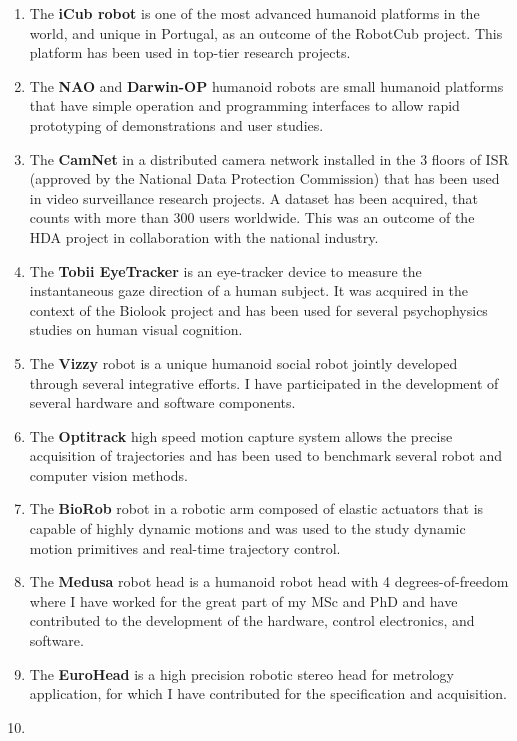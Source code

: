 \documentclass[
]{article}
\begin{document}
\begin{enumerate}
\def\labelenumi{\arabic{enumi}.}
\item
  The \textbf{iCub robot} is one of the most advanced humanoid platforms
  in the world, and unique in Portugal, as an outcome of the RobotCub
  project. This platform has been used in top-tier research projects.
\item
  The \textbf{NAO} and \textbf{Darwin-OP} humanoid robots are small
  humanoid platforms that have simple operation and programming
  interfaces to allow rapid prototyping of demonstrations and user
  studies.
\item
  The \textbf{CamNet} in a distributed camera network installed in the 3
  floors of ISR (approved by the National Data Protection Commission)
  that has been used in video surveillance research projects. A dataset
  has been acquired, that counts with more than 300 users worldwide.
  This was an outcome of the HDA project in collaboration with the
  national industry.
\item
  The \textbf{Tobii EyeTracker} is an eye-tracker device to measure the
  instantaneous gaze direction of a human subject. It was acquired in
  the context of the Biolook project and has been used for several
  psychophysics studies on human visual cognition.
\item
  The \textbf{Vizzy} robot is a unique humanoid social robot jointly
  developed through several integrative efforts. I have participated in
  the development of several hardware and software components.
\item
  The \textbf{Optitrack} high speed motion capture system allows the
  precise acquisition of trajectories and has been used to benchmark
  several robot and computer vision methods.
\item
  The \textbf{BioRob} robot in a robotic arm composed of elastic
  actuators that is capable of highly dynamic motions and was used to
  the study dynamic motion primitives and real-time trajectory control.
\item
  The \textbf{Medusa} robot head is a humanoid robot head with 4
  degrees-of-freedom where I have worked for the great part of my MSc
  and PhD and have contributed to the development of the hardware,
  control electronics, and software.
\item
  The \textbf{EuroHead} is a high precision robotic stereo head for
  metrology application, for which I have contributed for the
  specification and acquisition.
\item

\end{enumerate}
\end{document}
